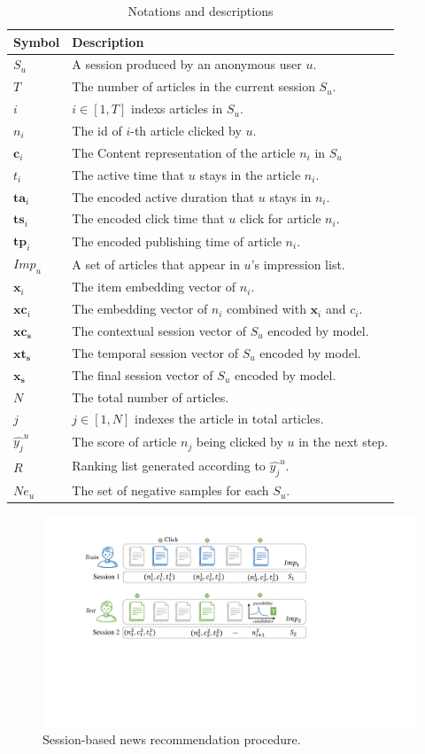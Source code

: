 \begin{table}
    \caption{Notations and descriptions}
    \begin{tabular}{|l|l|}
    \hline
    Symbol & Description\\
    \hline
    $S_u$ & A session produced by an anonymous user $u$.\\
    $T$ & The number of articles in the current session $S_u$.\\ 
    $i$ & $i\in [1,T]$ indexs articles in $S_u$.\\
    $n_i$ & The id of $i$-th article clicked by $u$.\\
    $\mathbf{c}_i$ & The Content representation of the article $n_i$ in $S_u$ \\
    $t_i$ & The active time that $u$ stays in the article $n_i$. \\
    $\mathbf{ta}_i$ & The encoded active duration that $u$ stays in $n_i$. \\
    $\mathbf{ts}_i$ & The encoded click time that $u$ click for article $n_i$. \\
    $\mathbf{tp}_i$ & The encoded publishing time of article $n_i$. \\
    $Imp_u$ & A set of articles that appear in $u$'s impression list.\\
    $\mathbf{x}_i$ & The item embedding vector of $n_i$.\\
    $\mathbf{xc}_i$ & The embedding vector of $n_i$ combined with $\mathbf{x}_i$ and $c_i$.\\
    $\mathbf{xc_s}$ & The contextual session vector of $S_u$ encoded by model.\\
    $\mathbf{xt_s}$ & The temporal session vector of $S_u$ encoded by model.\\
    $\mathbf{x_s}$ & The final session vector of $S_u$ encoded by model.\\
    $N$ & The total number of articles.\\
    $j$ & $j\in [1,N]$ indexes the article in total articles.\\
    $\hat{y_j}^u$ & The score of article $n_j$ being clicked by $u$ in the next step.\\
    $R$ & Ranking list generated according to $\hat{y_j}^u$.\\
    $Ne_u$ & The set of negative samples for each $S_u$.\\
    \hline
    \end{tabular}
    \label{tb:note}
\end{table}

\begin{figure}[th]
    \centering
    \includegraphics[width=\columnwidth]{fig/task.pdf}
    \caption{Session-based news recommendation procedure.}
    \label{fig:task}
\end{figure}
